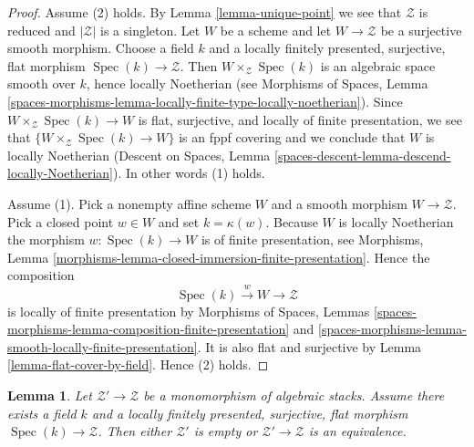 \documentclass{stacks-project}
\theoremstyle{plain}
\newtheorem{lemma}[subsection]{Lemma}
\theoremstyle{definition}
\theoremstyle{remark}
\numberwithin{equation}{subsection}
\def\Spec{\mathop{\mathrm{Spec}}}
\begin{document}
\begin{proof}
Assume (2) holds. By
Lemma \ref{lemma-unique-point}
we see that $\mathcal{Z}$ is reduced and $|\mathcal{Z}|$ is a singleton.
Let $W$ be a scheme and let $W \to \mathcal{Z}$ be a surjective smooth
morphism. Choose a field $k$ and a locally finitely presented, surjective,
flat morphism $\Spec(k) \to \mathcal{Z}$.
Then $W \times_\mathcal{Z} \Spec(k)$ is an algebraic space
smooth over $k$, hence locally Noetherian (see
Morphisms of Spaces, Lemma
\ref{spaces-morphisms-lemma-locally-finite-type-locally-noetherian}).
Since $W \times_\mathcal{Z} \Spec(k) \to W$
is flat, surjective, and locally of finite presentation, we see
that $\{W \times_\mathcal{Z} \Spec(k) \to W\}$ is an fppf covering
and we conclude that $W$ is locally Noetherian
(Descent on Spaces, Lemma
\ref{spaces-descent-lemma-descend-locally-Noetherian}).
In other words (1) holds.

\medskip\noindent
Assume (1). Pick a nonempty affine scheme $W$ and a smooth morphism
$W \to \mathcal{Z}$. Pick a closed point $w \in W$ and set
$k = \kappa(w)$. Because $W$ is locally Noetherian the morphism
$w : \Spec(k) \to W$ is of finite presentation, see
Morphisms, Lemma \ref{morphisms-lemma-closed-immersion-finite-presentation}.
Hence the composition
$$
\Spec(k) \xrightarrow{w} W \longrightarrow \mathcal{Z}
$$
is locally of finite presentation by
Morphisms of Spaces, Lemmas
\ref{spaces-morphisms-lemma-composition-finite-presentation} and
\ref{spaces-morphisms-lemma-smooth-locally-finite-presentation}.
It is also flat and surjective by
Lemma \ref{lemma-flat-cover-by-field}.
Hence (2) holds.
\end{proof}

\begin{lemma}
\label{lemma-monomorphism-into-point}
Let $\mathcal{Z}' \to \mathcal{Z}$ be a monomorphism of algebraic stacks.
Assume there exists a field $k$ and a locally finitely presented, surjective,
flat morphism $\Spec(k) \to \mathcal{Z}$. Then either $\mathcal{Z}'$
is empty or $\mathcal{Z}' \to \mathcal{Z}$ is an equivalence.
\end{lemma}
\end{document}
